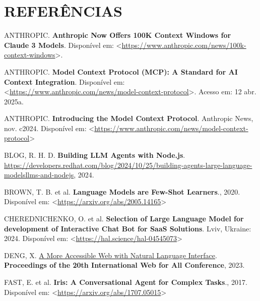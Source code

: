 \documentclass[
]{article}
\newlength{\cslhangindent}
\newenvironment{CSLReferences}[2] %
 {\begin{list}{}{%
  \setlength{\itemindent}{0pt}
  \setlength{\leftmargin}{0pt}
  \setlength{\parsep}{0pt}
  \ifodd #1
   \setlength{\leftmargin}{\cslhangindent}
   \setlength{\itemindent}{-1\cslhangindent}
  \fi
  \setlength{\itemsep}{#2\baselineskip}}}
 {\end{list}}
\begin{document}
\section*{REFERÊNCIAS}\label{referuxeancias}

\label{refs}
\begin{CSLReferences}{0}{1}
ANTHROPIC. \textbf{Anthropic Now Offers 100K Context Windows for Claude
3 Models}. Disponível em:
\textless{}\url{https://www.anthropic.com/news/100k-context-windows}\textgreater.

ANTHROPIC. \textbf{Model Context Protocol (MCP): A Standard for AI
Context Integration}. Disponível em:
\textless{}\url{https://www.anthropic.com/news/model-context-protocol}\textgreater.
Acesso em: 12 abr. 2025a.

ANTHROPIC. \textbf{{Introducing the Model Context Protocol}}. Anthropic
News, nov. c2024. Disponível em:
\textless{}\url{https://www.anthropic.com/news/model-context-protocol}\textgreater{}

BLOG, R. H. D. \textbf{Building LLM Agents with Node.js}.
\url{https://developers.redhat.com/blog/2024/10/25/building-agents-large-language-modelsllms-and-nodejs},
2024.

BROWN, T. B. et al. \textbf{Language Models are Few-Shot Learners}.,
2020. Disponível em:
\textless{}\url{https://arxiv.org/abs/2005.14165}\textgreater{}

CHEREDNICHENKO, O. et al. \textbf{Selection of Large Language Model for
development of Interactive Chat Bot for SaaS Solutions}. Lviv, Ukraine:
2024. Disponível em:
\textless{}\url{https://hal.science/hal-04545073}\textgreater{}

DENG, X. \href{https://api.semanticscholar.org/CorpusID:258259387}{A
More Accessible Web with Natural Language Interface}.
\textbf{Proceedings of the 20th International Web for All Conference},
2023.

FAST, E. et al. \textbf{Iris: A Conversational Agent for Complex
Tasks}., 2017. Disponível em:
\textless{}\url{https://arxiv.org/abs/1707.05015}\textgreater{}


\end{CSLReferences}
\end{document}
